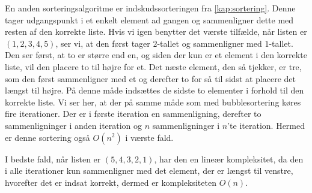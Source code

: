 En anden sorteringsalgoritme er indskudssorteringen fra \autoref{kap:sortering}. Denne tager udgangspunkt i et enkelt element ad gangen og sammenligner dette med resten af den korrekte liste.
Hvis vi igen benytter det værste tilfælde, når listen er $(1,2,3,4,5)$, ser vi, at den først tager $2$-tallet og sammenligner med $1$-tallet. Den ser først, at to er større end en, og siden der kun er et element i den korrekte liste, vil den placere to til højre for et. Det næste element, den så tjekker, er tre, som den først sammenligner med et og derefter to for så til sidst at placere det længst til højre. På denne måde indsættes de sidste to elementer i forhold til den korrekte liste.
Vi ser her, at der på samme måde som med bubblesortering køres fire iterationer. Der er i første iteration en sammenligning, derefter to sammenligninger i anden iteration og $n$ sammenligninger i $n$'te iteration. Hermed er denne sortering også $O(n^2)$ i værste fald.


I bedste fald, når listen er $(5,4,3,2,1)$, har den en lineær kompleksitet, da den i alle iterationer kun sammenligner med det element, der er længst til venstre, hvorefter det er indsat korrekt, dermed er kompleksiteten $O(n)$.





